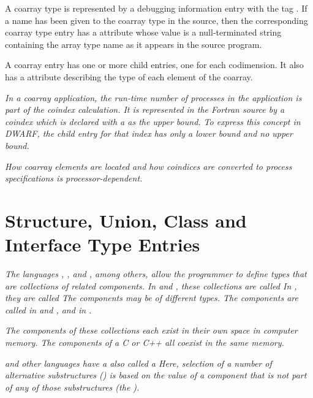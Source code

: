 A coarray type is represented by a debugging information entry 
with the tag \DWTAGcoarraytypeTARG.
If a name has been given to the 
coarray type in the source, then the corresponding coarray type 
entry has a \DWATname{} attribute whose value is a null-terminated 
string containing the array type name as it appears in the source 
program.

A coarray entry has one or more \DWTAGsubrangetype{} child entries,
one for each codimension. It also has a \DWATtype{} attribute 
describing the type of each element of the coarray.

\textit{In a coarray application, the run-time number of processes in the application
is part of the coindex calculation.  It is represented in the Fortran source by
a coindex which is declared with a \doublequote{*} as the upper bound.  To express this
concept in DWARF, the \DWTAGsubrangetype{} child entry for that index has 
only a lower bound and no upper bound.}

\textit{How coarray elements are located and how coindices are 
converted to process specifications is processor-dependent.}

\section{Structure, Union, Class and Interface Type Entries}
\label{chap:structureunionclassandinterfacetypeentries}

\textit{The languages 
, 
, and 
, among others, allow the
programmer to define types that are collections of related
components. 
In  and , these collections are called
In , they are called 
The components may be of different types. The components are
called  in  and 
, and  in .}

\textit{The components of these collections each exist in their
own space in computer memory. The components of a C or C++
 all coexist in the same memory.}

\textit{ and 
other languages have a 
also called a  Here, selection of a
number of alternative substructures () is based
on the value of a component that is not part of any of those
substructures (the ).}

